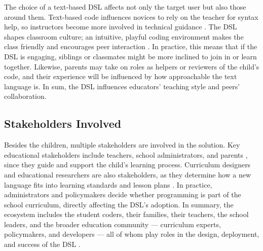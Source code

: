 The choice of a text-based DSL affects not only the target user but also those around them. 
Text-based code influences novices to rely on the teacher for syntax help, so instructors become more involved in technical guidance \cite{weintrop_comparing_2018}. 
The DSL shapes classroom culture; an intuitive, playful coding environment makes the class friendly and encourages peer interaction \cite{weintrop_comparing_2018}. 
In practice, this means that if the DSL is engaging, siblings or classmates might be more inclined to join in or learn together. 
Likewise, parents may take on roles as helpers or reviewers of the child's code, and their experience will be influenced by how approachable the text language is. 
In sum, the DSL influences educators' teaching style and peers' collaboration.

\subsection{Stakeholders Involved}

Besides the children, multiple stakeholders are involved in the solution. 
Key educational stakeholders include teachers, school administrators, and parents \cite{akkaya_examining_2025}, since they guide and support the child's learning process. 
Curriculum designers and educational researchers are also stakeholders, as they determine how a new language fits into learning standards and lesson plans \cite{noauthor_stakeholders_2022}. 
In practice, administrators and policymakers decide whether programming is part of the school curriculum, directly affecting the DSL's adoption. 
In summary, the ecosystem includes the student coders, their families, their teachers, the school leaders, and the broader education community --- curriculum experts, policymakers, and developers --- all of whom play roles in the design, deployment, and success of the DSL \cite{akkaya_examining_2025, noauthor_stakeholders_2022}.
